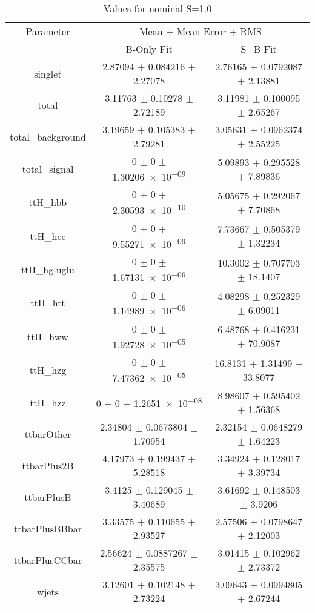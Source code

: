 \begin{table}
\centering
\caption{Values for nominal S=1.0}
\begin{tabular}{ccc}
\toprule
Parameter & \multicolumn{2}{c}{Mean $\pm$ Mean Error $\pm$ RMS}\\
 & B-Only Fit & S+B Fit\\
\midrule
singlet & \num{2.87094} $\pm$ \num{0.084216} $\pm$ \num{2.27078} & \num{2.76165} $\pm$ \num{0.0792087} $\pm$ \num{2.13881}\\
total & \num{3.11763} $\pm$ \num{0.10278} $\pm$ \num{2.72189} & \num{3.11981} $\pm$ \num{0.100095} $\pm$ \num{2.65267}\\
total\_background & \num{3.19659} $\pm$ \num{0.105383} $\pm$ \num{2.79281} & \num{3.05631} $\pm$ \num{0.0962374} $\pm$ \num{2.55225}\\
total\_signal & \num{0} $\pm$ \num{0} $\pm$ \num{1.30206e-09} & \num{5.09893} $\pm$ \num{0.295528} $\pm$ \num{7.89836}\\
ttH\_hbb & \num{0} $\pm$ \num{0} $\pm$ \num{2.30593e-10} & \num{5.05675} $\pm$ \num{0.292067} $\pm$ \num{7.70868}\\
ttH\_hcc & \num{0} $\pm$ \num{0} $\pm$ \num{9.55271e-09} & \num{7.73667} $\pm$ \num{0.505379} $\pm$ \num{1.32234}\\
ttH\_hgluglu & \num{0} $\pm$ \num{0} $\pm$ \num{1.67131e-06} & \num{10.3002} $\pm$ \num{0.707703} $\pm$ \num{18.1407}\\
ttH\_htt & \num{0} $\pm$ \num{0} $\pm$ \num{1.14989e-06} & \num{4.08298} $\pm$ \num{0.252329} $\pm$ \num{6.09011}\\
ttH\_hww & \num{0} $\pm$ \num{0} $\pm$ \num{1.92728e-05} & \num{6.48768} $\pm$ \num{0.416231} $\pm$ \num{70.9087}\\
ttH\_hzg & \num{0} $\pm$ \num{0} $\pm$ \num{7.47362e-05} & \num{16.8131} $\pm$ \num{1.31499} $\pm$ \num{33.8077}\\
ttH\_hzz & \num{0} $\pm$ \num{0} $\pm$ \num{1.2651e-08} & \num{8.98607} $\pm$ \num{0.595402} $\pm$ \num{1.56368}\\
ttbarOther & \num{2.34804} $\pm$ \num{0.0673804} $\pm$ \num{1.70954} & \num{2.32154} $\pm$ \num{0.0648279} $\pm$ \num{1.64223}\\
ttbarPlus2B & \num{4.17973} $\pm$ \num{0.199437} $\pm$ \num{5.28518} & \num{3.34924} $\pm$ \num{0.128017} $\pm$ \num{3.39734}\\
ttbarPlusB & \num{3.4125} $\pm$ \num{0.129045} $\pm$ \num{3.40689} & \num{3.61692} $\pm$ \num{0.148503} $\pm$ \num{3.9206}\\
ttbarPlusBBbar & \num{3.33575} $\pm$ \num{0.110655} $\pm$ \num{2.93527} & \num{2.57506} $\pm$ \num{0.0798647} $\pm$ \num{2.12003}\\
ttbarPlusCCbar & \num{2.56624} $\pm$ \num{0.0887267} $\pm$ \num{2.35575} & \num{3.01415} $\pm$ \num{0.102962} $\pm$ \num{2.73372}\\
wjets & \num{3.12601} $\pm$ \num{0.102148} $\pm$ \num{2.73224} & \num{3.09643} $\pm$ \num{0.0994805} $\pm$ \num{2.67244}\\
\bottomrule
\end{tabular}
\end{table}